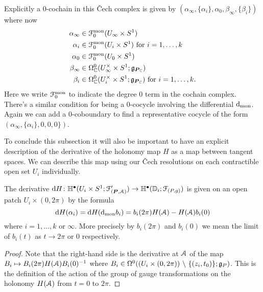 \documentclass[10pt, oneside]{article}
\renewcommand{\d}{\mathrm{d}}
\begin{document}

Explicitly a 0-cochain in this \v Cech complex is given by $(\alpha_\infty, \{\alpha_i\}, \alpha_0, \beta_\infty, \{\beta_i\})$ where now 
\begin{align*}
 \alpha_\infty &\in \mathcal{F}^{\mathrm{mon}}_0(U_\infty \times S^1) \\
 \alpha_i &\in \mathcal{F}^{\mathrm{mon}}_0(U_i\times S^1) \text{ for } i = 1,\ldots,k \\
 \alpha_0 &\in \mathcal{F}^{\mathrm{mon}}_0(U_0\times S^1) \\
 \beta_\infty &\in \Omega^0_{\mathbb{C}}(U_\infty^\times \times S^1; \mathfrak{g}_{\boldsymbol{P}_{\mathbb{C}}}) \\
 \beta_i &\in \Omega^0_{\mathbb{C}}(U_i^\times \times S^1; \mathfrak{g}_{\boldsymbol{P}_{\mathbb{C}}}) \text{ for } i=1,\ldots,k.
\end{align*}
Here we write $\mathcal{F}^{\mathrm{mon}}_0$ to indicate the degree 0 term in the cochain complex.  There's a similar condition for being a 0-cocycle involving the differential $\d_{\mr{mon}}$.  Again we can add a 0-coboundary to find a representative cocycle of the form $(\alpha_\infty, \{\alpha_i\}, 0,0,0\})$.

To conclude this subsection it will also be important to have an explicit description of the derivative of the holonomy map $H$ as a map between tangent spaces.  We can describe this map using our \v Cech resolutions on each contractible open set $U_i$ individually.

\begin{prop} \label{local_derivative_description_prop}
The derivative $\d H \colon \bb H^\bullet(U_i \times S^1 ; \mc F'_{(\bo P,\mc A)}) \to \bb H^\bullet(\bb D_i; \mc F_{(P,g)})$ is given on an open patch $U_i \times (0,2\pi)$ by the formula
\[\d H(\alpha_i) = \d H(\d_{\mr{mon}} b_i) = b_i(2\pi)H(\mc A) - H(\mc A)b_i(0)\]
where $i = 1, \ldots, k$ or $\infty$.  More precisely by $b_i(2\pi)$ and $b_i(0)$ we mean the limit of $b_i(t)$ as $t \to 2\pi$ or 0 respectively.
\end{prop}

\begin{proof}
Note that the right-hand side is the derivative at $\mathcal{A}$ of the map $B_i \mapsto B_i(2\pi)H(\mathcal{A})B_i(0)^{-1}$ where $B_i \in \Omega^0((U_i \times (0,2\pi)) \ \backslash \  \{(z_i, t_0)\}; \mathfrak{g}_P)$.  This is the definition of the action of the group of gauge transformations on the holonomy $H(\mathcal{A})$ from $t=0$ to $2\pi$. 
\end{proof}
\end{document}
